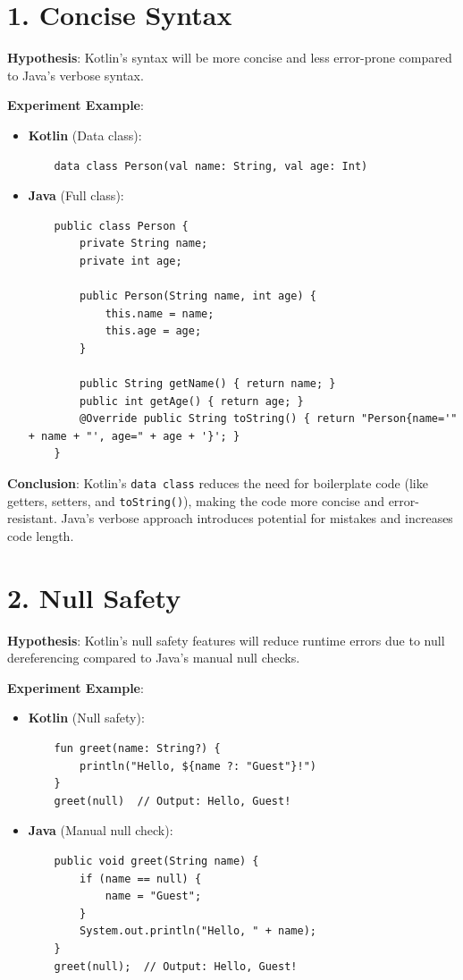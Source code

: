 \section*{1. Concise Syntax}

\textbf{Hypothesis}: Kotlin's syntax will be more concise and less error-prone compared to Java’s verbose syntax.

\textbf{Experiment Example}:
\begin{itemize}
    \item \textbf{Kotlin} (Data class):
    \begin{verbatim}
    data class Person(val name: String, val age: Int)
    \end{verbatim}
    
    \item \textbf{Java} (Full class):
    \begin{verbatim}
    public class Person {
        private String name;
        private int age;

        public Person(String name, int age) {
            this.name = name;
            this.age = age;
        }

        public String getName() { return name; }
        public int getAge() { return age; }
        @Override public String toString() { return "Person{name='" + name + "', age=" + age + '}'; }
    }
    \end{verbatim}
\end{itemize}

\textbf{Conclusion}: Kotlin's \texttt{data class} reduces the need for boilerplate code (like getters, setters, and \texttt{toString()}), making the code more concise and error-resistant. Java’s verbose approach introduces potential for mistakes and increases code length.

\section*{2. Null Safety}

\textbf{Hypothesis}: Kotlin’s null safety features will reduce runtime errors due to null dereferencing compared to Java’s manual null checks.

\textbf{Experiment Example}:
\begin{itemize}
    \item \textbf{Kotlin} (Null safety):
    \begin{verbatim}
    fun greet(name: String?) {
        println("Hello, ${name ?: "Guest"}!")
    }
    greet(null)  // Output: Hello, Guest!
    \end{verbatim}
    
    \item \textbf{Java} (Manual null check):
    \begin{verbatim}
    public void greet(String name) {
        if (name == null) {
            name = "Guest";
        }
        System.out.println("Hello, " + name);
    }
    greet(null);  // Output: Hello, Guest!
    \end{verbatim}
\end{itemize}

